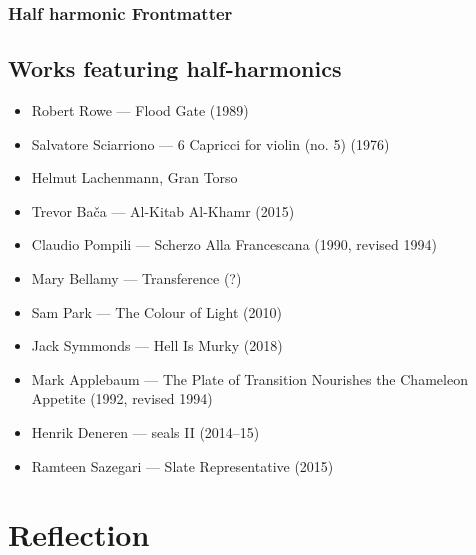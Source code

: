 \subsubsection{Half harmonic Frontmatter}\label{sec:halfHarmonicFrontmatter}

\subsection{Works featuring half-harmonics}\label{sec:half-harmonicsLiterature}

\begin{itemize}
    \item Robert Rowe --- Flood Gate (1989)
    \item Salvatore Sciarriono --- 6 Capricci for violin (no. 5) (1976) 
    \item Helmut Lachenmann, Gran Torso
    \item Trevor Bača --- Al-Kitab Al-Khamr (2015)
    \item Claudio Pompili --- Scherzo Alla Francescana (1990, revised 1994)
    \item Mary Bellamy --- Transference (?)
    \item Sam Park --- The Colour of Light (2010)
    \item Jack Symmonds --- Hell Is Murky (2018)
    \item Mark Applebaum --- The Plate of Transition Nourishes the Chameleon Appetite (1992, revised 1994)
    \item Henrik Deneren --- seals II (2014--15)
    \item Ramteen Sazegari --- Slate Representative (2015)
\end{itemize}

\section{Reflection}




\lipsum[4]